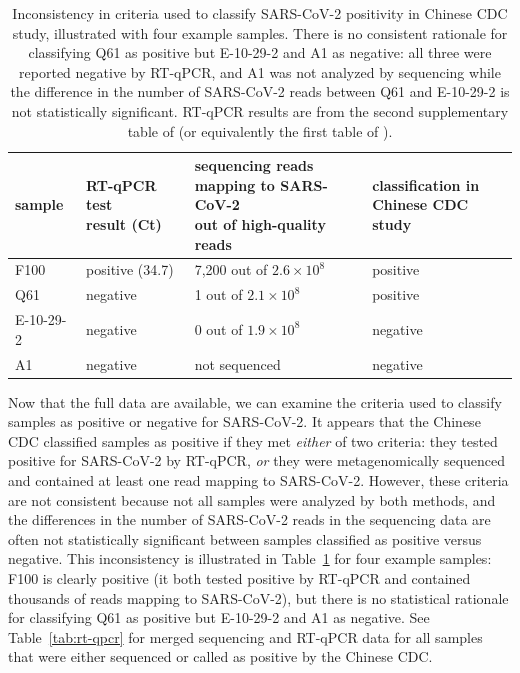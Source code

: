 \documentclass[9pt,twocolumn,twoside]{gsajnl_modified}
\begin{document}
\begin{table}
\caption{
Inconsistency in criteria used to classify SARS-CoV-2 positivity in Chinese CDC study, illustrated with four example samples.
There is no consistent rationale for classifying Q61 as positive but E-10-29-2 and A1 as negative: all three were reported negative by RT-qPCR, and A1 was not analyzed by sequencing while the difference in the number of SARS-CoV-2 reads between Q61 and E-10-29-2 is not statistically significant.
RT-qPCR results are from the second supplementary table of \citet{liu2023surveillance} (or equivalently the first table of \citet{liu2022surveillance}).
\label{tab:consistency}
}
{\footnotesize
\setlength{\tabcolsep}{5pt}
\renewcommand{\arraystretch}{1.3}
\begin{tabular}{llll}
\toprule
sample & \makecell[l]{RT-qPCR test \\ result (Ct)} & \makecell[l]{sequencing reads \\ mapping to SARS-CoV-2 \\ out of high-quality reads} & \makecell[l]{classification in \\ Chinese CDC study} \\
\midrule
F100 & positive (34.7) & 7,200 out of $2.6 \times 10^8$ & positive \\
Q61 & negative & 1 out of $2.1 \times 10^8$ & positive \\
E-10-29-2 & negative & 0 out of $1.9 \times 10^8$ & negative \\
A1 & negative & not sequenced & negative \\
\bottomrule
\end{tabular}
}
\end{table}

Now that the full data are available, we can examine the criteria used to classify samples as positive or negative for SARS-CoV-2.
It appears that the Chinese CDC classified samples as positive if they met \emph{either} of two criteria: they tested positive for SARS-CoV-2 by RT-qPCR, \emph{or} they were metagenomically sequenced and contained at least one read mapping to SARS-CoV-2.
However, these criteria are not consistent because not all samples were analyzed by both methods, and the differences in the number of SARS-CoV-2 reads in the sequencing data are often not statistically significant between samples classified as positive versus negative.
This inconsistency is illustrated in Table~\ref{tab:consistency} for four example samples: F100 is clearly positive (it both tested positive by RT-qPCR and contained thousands of reads mapping to SARS-CoV-2), but there is no statistical rationale for classifying Q61 as positive but E-10-29-2 and A1 as negative.
See Table~\ref{tab:rt-qpcr} for merged sequencing and RT-qPCR data for all samples that were either sequenced or called as positive by the Chinese CDC.
\end{document}
